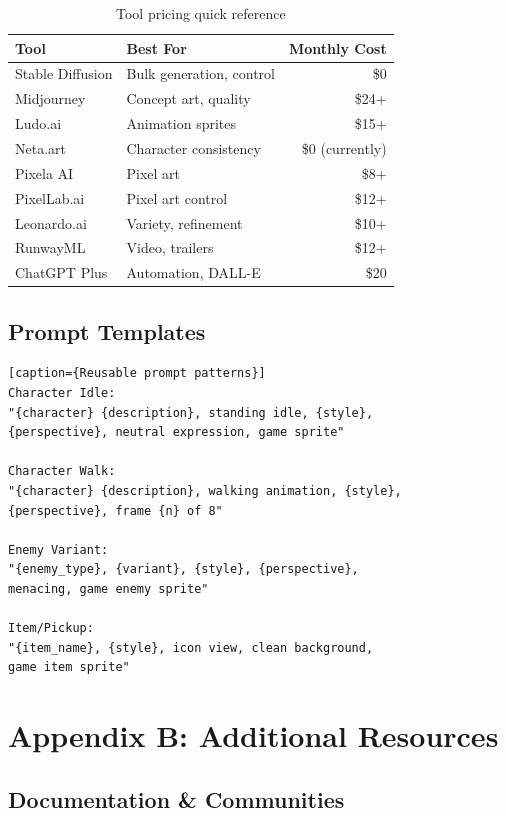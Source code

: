 \documentclass[11pt]{article}
\begin{document}
\begin{table}[H]
\centering
\begin{tabular}{llr}
\toprule
\textbf{Tool} & \textbf{Best For} & \textbf{Monthly Cost} \\
\midrule
Stable Diffusion & Bulk generation, control & \$0 \\
Midjourney & Concept art, quality & \$24+ \\
Ludo.ai & Animation sprites & \$15+ \\
Neta.art & Character consistency & \$0 (currently) \\
Pixela AI & Pixel art & \$8+ \\
PixelLab.ai & Pixel art control & \$12+ \\
Leonardo.ai & Variety, refinement & \$10+ \\
RunwayML & Video, trailers & \$12+ \\
ChatGPT Plus & Automation, DALL-E & \$20 \\
\bottomrule
\end{tabular}
\caption{Tool pricing quick reference}
\end{table}

\subsection{Prompt Templates}

\begin{verbatim}[caption={Reusable prompt patterns}]
Character Idle:
"{character} {description}, standing idle, {style},
{perspective}, neutral expression, game sprite"

Character Walk:
"{character} {description}, walking animation, {style},
{perspective}, frame {n} of 8"

Enemy Variant:
"{enemy_type}, {variant}, {style}, {perspective},
menacing, game enemy sprite"

Item/Pickup:
"{item_name}, {style}, icon view, clean background,
game item sprite"
\end{verbatim}

\section{Appendix B: Additional Resources}

\subsection{Documentation \& Communities}
\end{document}
